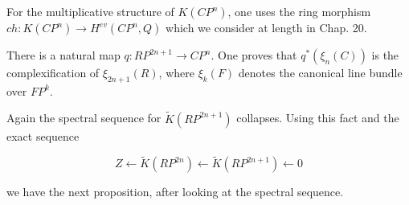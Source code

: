 For the multiplicative structure of $K(CP^n)$, one uses the ring morphism $ch: K(CP^n) \rightarrow H^{ev}(CP^n, Q)$ which we consider at length in Chap. 20.

There is a natural map $q: RP^{2n+1} \rightarrow CP^n$. One proves that $q^*(\xi_n(C))$ is the complexification of $\xi_{2n+1}(R)$, where $\xi_k(F)$ denotes the canonical line bundle over $FP^k$.

Again the spectral sequence for $\tilde{K}(RP^{2n+1})$ collapses. Using this fact and the exact sequence

$$Z \leftarrow \tilde{K}(RP^{2n}) \leftarrow \tilde{K}(RP^{2n+1}) \leftarrow 0$$

we have the next proposition, after looking at the spectral sequence.
